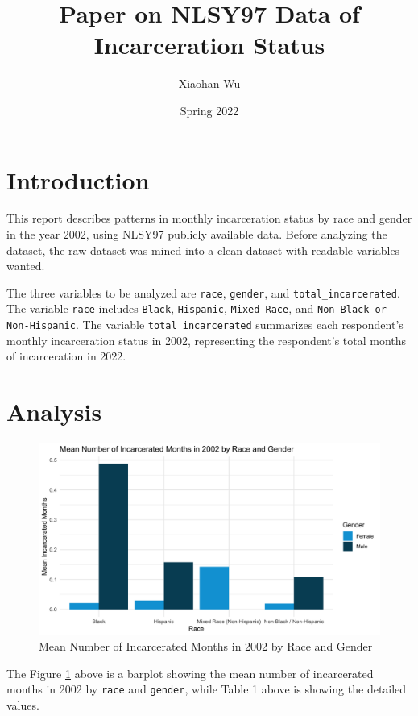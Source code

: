\documentclass{article}
\author{Xiaohan Wu}
\title{Paper on NLSY97 Data of Incarceration Status}
\date{Spring 2022}
\begin{document}
\maketitle

\section{Introduction}

This report describes patterns in monthly incarceration status by race and gender in the year 2002, using NLSY97 publicly available data. Before analyzing the dataset, the raw dataset was mined into a clean dataset with readable variables wanted.

The three variables to be analyzed are \texttt{race}, \texttt{gender}, and \texttt{total\_incarcerated}. The variable \texttt{race} includes \texttt{Black}, \texttt{Hispanic}, \texttt{Mixed Race}, and \texttt{Non-Black or Non-Hispanic}. The variable \texttt{total\_incarcerated} summarizes each respondent's monthly incarceration status in 2002, representing the respondent's total months of incarceration in 2022.

\section{Analysis}

\begin{figure}[H]
    \begin{center}
        \includegraphics[width=.85\textwidth]{incarcerations_by_racegender}
    \end{center}
    \caption{Mean Number of Incarcerated Months in 2002 by Race and Gender}
    \label{fig:graph}
\end{figure}



The Figure \ref{fig:graph} above is a barplot showing the mean number of incarcerated months in 2002 by \texttt{race} and \texttt{gender}, while Table 1 above is showing the detailed values.
\end{document}
